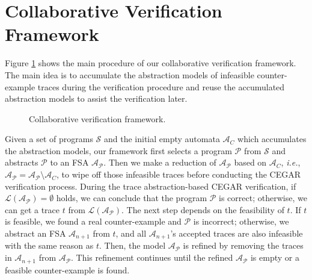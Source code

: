 \section{Collaborative Verification Framework}

Figure \ref{fig:framework} shows the main procedure of our collaborative verification framework.
The main idea is to accumulate the abstraction models of infeasible counter-example traces during
the verification procedure and reuse the accumulated abstraction models to assist the verification later.



% 


\begin{figure}[!hbt]
\centering

\caption{Collaborative verification framework.}
\label{fig:framework}
\end{figure}


Given a set of programs $\mathcal{S}$ and the initial empty automata $\mathcal{A}_C$
which accumulates the abstraction models, our framework first selects a program $\mathcal{P}$
from $\mathcal{S}$ and abstracts $\mathcal{P}$ to an FSA $\mathcal{A}_\mathcal{P}$.
Then we make a reduction of $\mathcal{A}_\mathcal{P}$ based on $\mathcal{A}_C$, \emph{i.e.},
$\mathcal{A}_{\mathcal{P}} = \mathcal{A}_{\mathcal{P}} \setminus \mathcal{A}_{C}$,
to wipe off those infeasible traces before conducting the CEGAR verification process.
During the trace abstraction-based CEGAR verification,
if $\mathcal{L}(\mathcal{A}_{\mathcal{P}}) = \emptyset$ holds, we can conclude that the
program $\mathcal{P}$ is correct; otherwise, we can get a trace $t$
from $\mathcal{L}(\mathcal{A}_{\mathcal{P}})$. The next step depends on the feasibility of $t$.
If $t$ is feasible, we found a real counter-example and $\mathcal{P}$ is incorrect; otherwise,
we abstract an FSA $\mathcal{A}_{n+1}$ from $t$, and all $\mathcal{A}_{n+1}$'s accepted traces are also
infeasible with the same reason as $t$. Then, the model $\mathcal{A}_\mathcal{P}$ is refined by removing the traces in
$\mathcal{A}_{n+1}$ from $\mathcal{A}_\mathcal{P}$. This refinement continues until the refined $\mathcal{A}_\mathcal{P}$
is empty or a feasible counter-example is found.%

